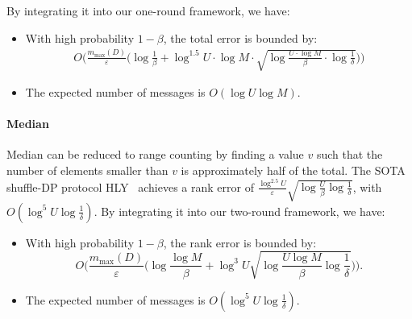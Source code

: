 By integrating it into our one-round framework, we have:
\begin{itemize}
\item With high probability $1-\beta$, the total error is bounded by: 
\[
\begin{aligned}
O\Bigg(
\frac{m_{\max}(D)}{\varepsilon}\Big(
\log \frac{1}{\beta} + \log^{1.5} U \cdot \log M \cdot \sqrt{
\log \frac{U\cdot\log M}{\beta}
\cdot \log \frac{1}{\delta}
}
\Big)
\Bigg)
\end{aligned}
\]

\item The expected number of messages is $O(\log U \log M)$.
\end{itemize}


\paragraph{Median}

Median can be reduced to range counting by finding a value $v$ such that the number of elements smaller than $v$ is approximately half of the total. The SOTA shuffle-DP protocol HLY~\cite{huang2021instance} achieves a rank error of $\frac{\log^{2.5} U}{\varepsilon} \sqrt{\log \frac{U}{\beta}\log \frac{1}{\delta}}$, with $O(\log ^5 U \log \frac{1}{\delta})$.
By integrating it into our two-round framework, we have:
\begin{itemize}
\item With high probability $1-\beta$, the rank error is bounded by: $$O\Big(\frac{m_{\max}(D)}{\varepsilon}\big( \log \frac{\log M}{\beta}+\log^3 U \sqrt{\log \frac{U\log M}{\beta}\log \frac{1}{\delta}}\big)\Big).$$
\item The expected number of messages is $O(\log ^5 U \log \frac{1}{\delta})$.
\end{itemize}

